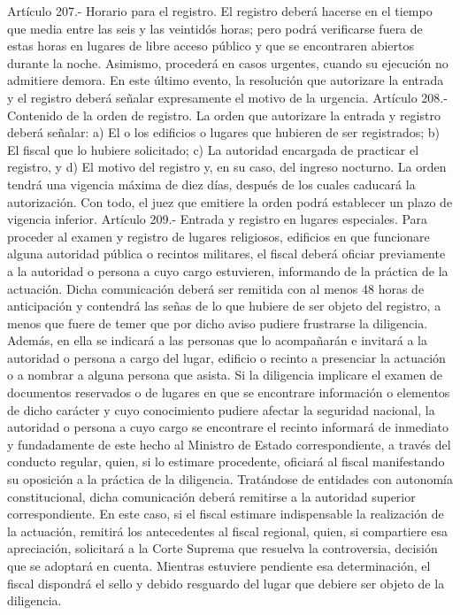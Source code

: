     Artículo 207.- Horario para el registro. El registro deberá hacerse en el tiempo que media entre las seis y las veintidós horas; pero podrá verificarse fuera de estas horas en lugares de libre acceso público y que se encontraren abiertos durante la noche. Asimismo, procederá en casos urgentes, cuando su ejecución no admitiere demora. En este último evento, la resolución que autorizare la entrada y el registro deberá señalar expresamente el motivo de la urgencia.
    Artículo 208.- Contenido de la orden de registro. La orden que autorizare la entrada y registro deberá señalar:
    a) El o los edificios o lugares que hubieren de ser registrados;
    b) El fiscal que lo hubiere solicitado;
    c) La autoridad encargada de practicar el registro, y
    d) El motivo del registro y, en su caso, del ingreso nocturno.
    La orden tendrá una vigencia máxima de diez días, después de los cuales caducará la autorización. Con todo, el juez que emitiere la orden podrá establecer un plazo de vigencia inferior.
    Artículo 209.- Entrada y registro en lugares especiales. Para proceder al examen y registro de lugares religiosos, edificios en que funcionare alguna autoridad pública o recintos militares, el fiscal deberá oficiar previamente a la autoridad o persona a cuyo cargo estuvieren, informando de la práctica de la actuación. Dicha comunicación deberá ser remitida con al menos 48 horas de anticipación y contendrá las señas de lo que hubiere de ser objeto del registro, a menos que fuere de temer que por dicho aviso pudiere frustrarse la diligencia. Además, en ella se indicará a las personas que lo acompañarán e invitará a la autoridad o persona a cargo del lugar, edificio o recinto a presenciar la actuación o a nombrar a alguna persona que asista.
    Si la diligencia implicare el examen de documentos reservados o de lugares en que se encontrare información o elementos de dicho carácter y cuyo conocimiento pudiere afectar la seguridad nacional, la autoridad o persona a cuyo cargo se encontrare el recinto informará de inmediato y fundadamente de este hecho al Ministro de Estado correspondiente, a través del conducto regular, quien, si lo estimare procedente, oficiará al fiscal manifestando su oposición a la práctica de la diligencia. Tratándose de entidades con autonomía constitucional, dicha comunicación deberá remitirse a la autoridad superior correspondiente.
    En este caso, si el fiscal estimare indispensable la realización de la actuación, remitirá los antecedentes al fiscal regional, quien, si compartiere esa apreciación, solicitará a la Corte Suprema que resuelva la controversia, decisión que se adoptará en cuenta. Mientras estuviere pendiente esa determinación, el fiscal dispondrá el sello y debido resguardo del lugar que debiere ser objeto de la diligencia.
